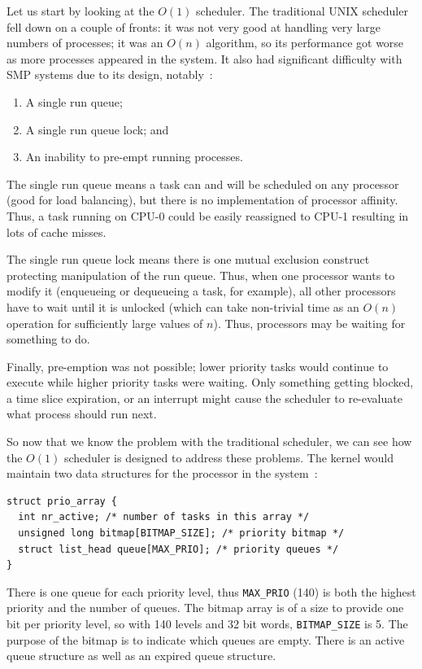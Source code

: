 Let us start by looking at the $O(1)$ scheduler. The traditional UNIX scheduler fell down on a couple of fronts: it was not very good at handling very large numbers of processes; it was an $O(n)$ algorithm, so its performance got worse as more processes appeared in the system. It also had significant difficulty with SMP systems due to its design, notably~\cite{osi}:

\begin{enumerate}
	\item A single run queue;
	\item A single run queue lock; and
	\item An inability to pre-empt running processes.
\end{enumerate}

The single run queue means a task can and will be scheduled on any processor (good for load balancing), but there is no implementation of processor affinity. Thus, a task running on CPU-0 could be easily reassigned to CPU-1 resulting in lots of cache misses.

The single run queue lock means there is one mutual exclusion construct protecting manipulation of the run queue. Thus, when one processor wants to modify it (enqueueing or dequeueing a task, for example), all other processors have to wait until it is unlocked (which can take non-trivial time as an $O(n)$ operation for sufficiently large values of $n$). Thus, processors may be waiting for something to do.

Finally, pre-emption was not possible; lower priority tasks would continue to execute while higher priority tasks were waiting. Only something getting blocked, a time slice expiration, or an interrupt might cause the scheduler to re-evaluate what process should run next.

So now that we know the problem with the traditional scheduler, we can see how the $O(1)$ scheduler is designed to address these problems. The kernel would maintain two data structures for the processor in the system~\cite{osi}:

\begin{verbatim}
struct prio_array {
  int nr_active; /* number of tasks in this array */
  unsigned long bitmap[BITMAP_SIZE]; /* priority bitmap */
  struct list_head queue[MAX_PRIO]; /* priority queues */
}
\end{verbatim}

There is one queue for each priority level, thus \texttt{MAX\_PRIO} (140) is both the highest priority and the number of queues. The bitmap array is of a size to provide one bit per priority level, so with 140 levels and 32 bit words, \texttt{BITMAP\_SIZE} is 5. The purpose of the bitmap is to indicate which queues are empty. There is an active queue structure as well as an expired queue structure.

